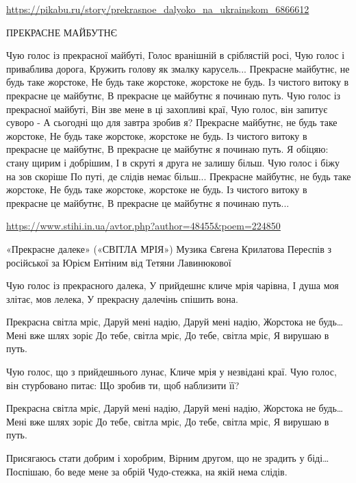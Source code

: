  
 
 
 
 

\url{https://pikabu.ru/story/prekrasnoe_dalyoko_na_ukrainskom_6866612}

ПРЕКРАСНЕ МАЙБУТНЄ

Чую голос із прекрасної майбуті,
Голос вранішній в сріблястій росі,
Чую голос і приваблива дорога,
Кружить голову як змалку карусель...
Прекрасне майбутнє, не будь таке жорстоке,
Не будь таке жорстоке, жорстоке не будь.
Із чистого витоку в прекрасне це майбутнє,
В прекрасне це майбутнє я починаю путь.
Чую голос із прекрасної майбуті,
Він зве мене в ці захопливі краї,
Чую голос, він запитує суворо -
А сьогодні що для завтра зробив я?
Прекрасне майбутнє, не будь таке жорстоке,
Не будь таке жорстоке, жорстоке не будь.
Із чистого витоку в прекрасне це майбутнє,
В прекрасне це майбутнє я починаю путь.
Я обіцяю: стану щирим і добрішим,
І в скруті я друга не залишу більш.
Чую голос і біжу на зов скоріше
По путі, де слідів немає більш...
Прекрасне майбутнє, не будь таке жорстоке,
Не будь таке жорстоке, жорстоке не будь.
Із чистого витоку в прекрасне це майбутнє,
В прекрасне це майбутнє я починаю путь...

\url{https://www.stihi.in.ua/avtor.php?author=48455&poem=224850}

«Прекрасне далеке» («СВІТЛА МРІЯ»)
Музика Євгена Крилатова
Переспів з російської за Юрієм Ентіним
від Тетяни Лавинюкової

Чую голос із прекрасного далека,
У прийдешнє кличе мрія чарівна,
І душа моя злітає, мов лелека,
У прекрасну далечінь спішить вона.

Прекрасна світла мріє,
Даруй мені надію,
Даруй мені надію,
Жорстока не будь…
Мені вже шлях зоріє
До тебе, світла мріє,
До тебе, світла мріє,
Я вирушаю в путь.

Чую голос, що з прийдешнього лунає,
Кличе мрія у незвідані краї.
Чую голос, він стурбовано питає:
Що зробив ти, щоб наблизити її?

Прекрасна світла мріє,
Даруй мені надію,
Даруй мені надію,
Жорстока не будь…
Мені вже шлях зоріє
До тебе, світла мріє,
До тебе, світла мріє,
Я вирушаю в путь.

Присягаюсь стати добрим і хоробрим,
Вірним другом, що не зрадить у біді…
Поспішаю, бо веде мене за обрій
Чудо-стежка, на якій нема слідів.

